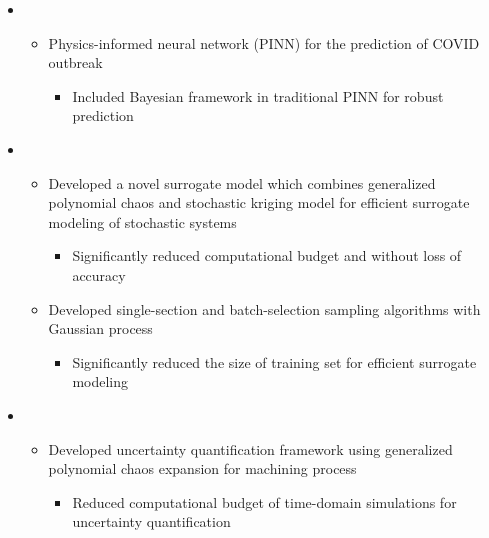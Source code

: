 \documentclass[10pt]{article}
\begin{document}
\begin{itemize}
\begin{itemize}[label=$\bullet$]
	    \item {}
		\begin{itemize}[label=$\bullet$]
		    \item Physics-informed neural network (PINN) for the prediction of COVID outbreak 
		    \begin{itemize}[label=$-$]
	            \item Included Bayesian framework in traditional PINN for robust prediction
	        \end{itemize}
		\end{itemize}
		
	    \item {}
	    \begin{itemize}[label=$\bullet$]
	        \item Developed a novel surrogate model which combines generalized polynomial chaos and stochastic kriging model for efficient surrogate modeling of stochastic systems
	        \begin{itemize}[label=$-$]
	            \item Significantly reduced computational budget and without loss of accuracy 
	        \end{itemize}
	        
	        \item Developed single-section and batch-selection sampling algorithms with Gaussian process
	        \begin{itemize}[label=$-$]
	            \item Significantly reduced the size of training set for efficient surrogate modeling
	        \end{itemize}
	    \end{itemize}
	    
		\item {}
		\begin{itemize}[label=$\bullet$]
		    \item Developed uncertainty quantification framework using generalized polynomial chaos expansion for machining process 
		    \begin{itemize}[label=$-$]
		    \item Reduced computational budget of time-domain simulations for uncertainty quantification
		    \end{itemize}
		\end{itemize}
	\end{itemize}
\end{itemize}
\end{document}
